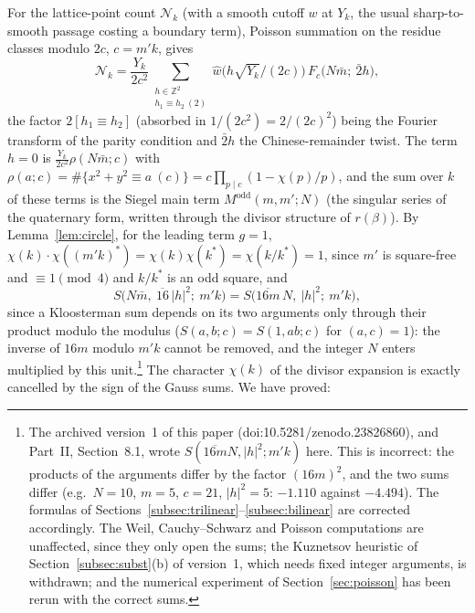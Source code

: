 \documentclass[11pt]{amsart}
\theoremstyle{remark}
\newcommand{\Z}{\mathbb{Z}}
\begin{document}
For the lattice-point count $\mathcal N_k$ (with a smooth cutoff $w$ at $Y_k$, the usual sharp-to-smooth passage costing a boundary term), Poisson summation on the residue classes modulo $2c$, $c=m'k$, gives
\begin{equation}\label{eq:poisson}
\mathcal N_k=\frac{Y_k}{2c^2}\sum_{\substack{h\in\Z^2\\ h_1\equiv h_2\ (2)}}\hat w\bigl(h\sqrt{Y_k}/(2c)\bigr)\,F_c\bigl(N\bar m;\ \bar2h\bigr),
\end{equation}
the factor $2[h_1\equiv h_2]$ (absorbed in $1/(2c^2)=2/(2c)^2$) being the Fourier transform of the parity condition and $\bar2h$ the Chinese-remainder twist. The term $h=0$ is $\frac{Y_k}{2c^2}\rho(N\bar m;c)$ with $\rho(a;c)=\#\{x^2+y^2\equiv a\ (c)\}=c\prod_{p\mid c}(1-\chi(p)/p)$, and the sum over $k$ of these terms is the Siegel main term $M^{\mathrm{odd}}(m,m';N)$ (the singular series of the quaternary form, written through the divisor structure of $r(\beta)$). By Lemma~\ref{lem:circle}, for the leading term $g=1$, $\chi(k)\cdot\chi((m'k)^{*})=\chi(k)\chi(k^{*})=\chi(k/k^{*})=1$, since $m'$ is square-free and $\equiv1\pmod4$ and $k/k^{*}$ is an odd square, and
\[
S\bigl(N\bar m,\ \overline{16}\,|h|^2;\ m'k\bigr)=S\bigl(\overline{16m}\,N,\ |h|^2;\ m'k\bigr),
\]
since a Kloosterman sum depends on its two arguments only through their product modulo the modulus ($S(a,b;c)=S(1,ab;c)$ for $(a,c)=1$): the inverse of $16m$ modulo $m'k$ cannot be removed, and the integer $N$ enters multiplied by this unit.\footnote{The archived version~1 of this paper (doi:10.5281/zenodo.23826860), and Part~II, Section~8.1, wrote $S(\overline{16m}N,|h|^2;m'k)$ here. This is incorrect: the products of the arguments differ by the factor $(16m)^2$, and the two sums differ (e.g.\ $N=10$, $m=5$, $c=21$, $|h|^2=5$: $-1.110$ against $-4.494$). The formulas of Sections~\ref{subsec:trilinear}--\ref{subsec:bilinear} are corrected accordingly. The Weil, Cauchy--Schwarz and Poisson computations are unaffected, since they only open the sums; the Kuznetsov heuristic of Section~\ref{subsec:subst}(b) of version~1, which needs fixed integer arguments, is withdrawn; and the numerical experiment of Section~\ref{sec:poisson} has been rerun with the correct sums.} The character $\chi(k)$ of the divisor expansion is exactly cancelled by the sign of the Gauss sums. We have proved:
\end{document}
